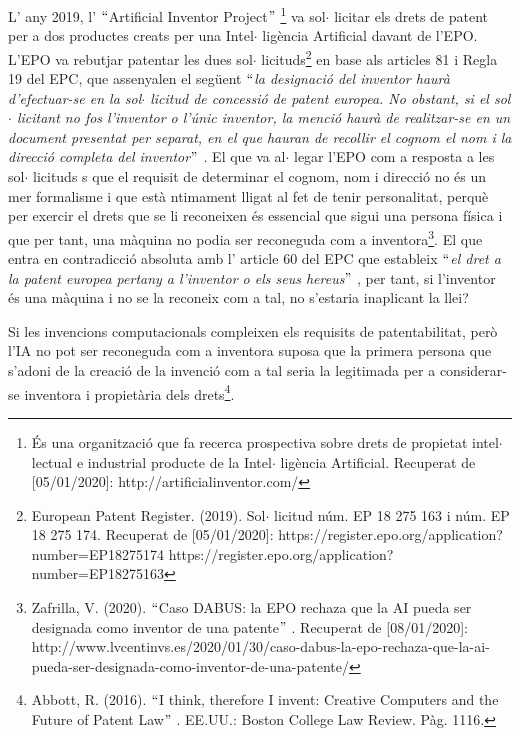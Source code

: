 \documentclass[12pt]{article}
\renewcommand{\_}{\kern-1.5pt\textunderscore\kern-1.5pt}
\begin{document}
\begin{itemize}
\vspace{\baselineskip}
\begin{justify}
L’ any 2019, l’ $``$Artificial Inventor Project$"$  \footnote{ És una organització que fa recerca prospectiva sobre drets de propietat intel$ \cdot $ lectual e industrial producte de la Intel$ \cdot $ ligència Artificial. Recuperat de [05/01/2020]: http://artificialinventor.com/ } va sol$ \cdot $ licitar els drets de patent per a dos productes creats per una Intel$ \cdot $ ligència Artificial davant de l’EPO. L’EPO va rebutjar patentar les dues sol$ \cdot $ licituds\footnote{ European Patent Register. (2019). Sol$ \cdot $ licitud núm. EP 18 275 163 i núm. EP 18 275 174. Recuperat de [05/01/2020]: https://register.epo.org/application?number=EP18275174 https://register.epo.org/application?number=EP18275163 } en base als articles 81 i Regla 19 del EPC, que assenyalen el següent $``$\textit{la designació del inventor haurà d’efectuar-se en la sol$ \cdot $ licitud de concessió de patent europea. No obstant, si el sol$ \cdot $ licitant no fos l’inventor o l’únic inventor, la menció haurà de realitzar-se en un document presentat per separat, en el que hauran de recollir el cognom el nom i la direcció completa del inventor$"$ . }El que va al$ \cdot $ legar l’EPO com a resposta a les sol$ \cdot $ licituds s que el requisit de determinar el cognom, nom i direcció no és un mer formalisme i que està ntimament lligat al fet de tenir personalitat, perquè per exercir el drets que se li reconeixen és essencial que sigui una persona física i que per tant, una màquina no podia ser reconeguda com a inventora\footnote{ Zafrilla, V. (2020). $``$Caso DABUS: la EPO rechaza que la AI pueda ser designada como inventor de una patente$"$ . Recuperat de [08/01/2020]: http://www.lvcentinvs.es/2020/01/30/caso-dabus-la-epo-rechaza-que-la-ai-pueda-ser-designada-como-inventor-de-una-patente/ }. El que entra en contradicció absoluta amb l’ article 60 del EPC que estableix $``$\textit{el dret a la patent europea pertany a l’inventor o els seus hereus$"$ }, per tant, si l’inventor és una màquina i no se la reconeix com a tal, no s’estaria inaplicant la llei? 
\end{justify}\par

\begin{justify}
Si les invencions computacionals compleixen els requisits de patentabilitat, però l’IA no pot ser reconeguda com a inventora suposa que la primera persona que s’adoni de la creació de la invenció com a tal seria la legitimada per a considerar-se inventora i propietària dels drets\footnote{ Abbott, R. (2016). $``$I think, therefore I invent: Creative Computers and the Future of Patent Law$"$ . EE.UU.: Boston College Law Review. Pàg. 1116. }.
\end{justify}\par


\end{itemize}
\end{document}

